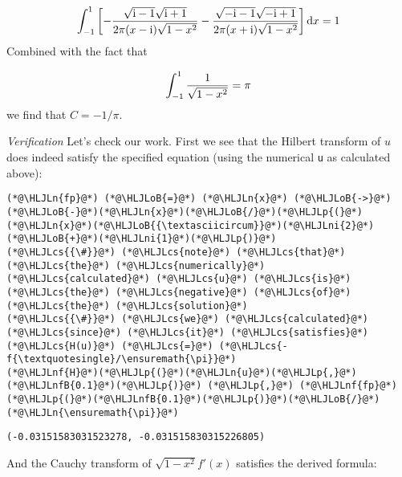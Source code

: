 \documentclass[12pt,landscape]{article}
\newcommand{\HLJLn}[1]{#1}
\newcommand{\HLJLnf}[1]{\textcolor[RGB]{66,102,213}{#1}}
\newcommand{\HLJLnfB}[1]{\textcolor[RGB]{59,151,46}{#1}}
\newcommand{\HLJLni}[1]{\textcolor[RGB]{59,151,46}{#1}}
\newcommand{\HLJLoB}[1]{\textcolor[RGB]{102,102,102}{\textbf{#1}}}
\newcommand{\HLJLp}[1]{#1}
\newcommand{\HLJLcs}[1]{\textcolor[RGB]{153,153,119}{\textit{#1}}}
\def\D{ {\rm d} }
\def\I{ {\rm i} }
\def\dx{\D x}
\begin{document}
{\[
\int_{-1}^1\left[- {\sqrt{\I - 1} \sqrt{\I+1} \over 2 \pi (x-\I)\sqrt{1-x^2}} -  {\sqrt{-\I - 1} \sqrt{-\I+1} \over 2 \pi (x+\I) \sqrt{1-x^2}} \right]\dx = 1
\]
Combined with the fact that

\[
\int_{-1}^1 {1 \over \sqrt{1-x^2}} = \pi
\]
we find that $C = -1/\pi$.

\emph{Verification} Let's check our work. First we see that the Hilbert transform of $u$ does indeed satisfy the specified equation (using the numerical \texttt{u} as calculated above):


\begin{lstlisting}
(*@\HLJLn{fp}@*) (*@\HLJLoB{=}@*) (*@\HLJLn{x}@*) (*@\HLJLoB{->}@*) (*@\HLJLoB{-}@*)(*@\HLJLn{x}@*)(*@\HLJLoB{/}@*)(*@\HLJLp{(}@*)(*@\HLJLn{x}@*)(*@\HLJLoB{{\textasciicircum}}@*)(*@\HLJLni{2}@*)(*@\HLJLoB{+}@*)(*@\HLJLni{1}@*)(*@\HLJLp{)}@*)
(*@\HLJLcs{{\#}}@*) (*@\HLJLcs{note}@*) (*@\HLJLcs{that}@*) (*@\HLJLcs{the}@*) (*@\HLJLcs{numerically}@*) (*@\HLJLcs{calculated}@*) (*@\HLJLcs{u}@*) (*@\HLJLcs{is}@*) (*@\HLJLcs{the}@*) (*@\HLJLcs{negative}@*) (*@\HLJLcs{of}@*) (*@\HLJLcs{the}@*) (*@\HLJLcs{solution}@*)
(*@\HLJLcs{{\#}}@*) (*@\HLJLcs{we}@*) (*@\HLJLcs{calculated}@*) (*@\HLJLcs{since}@*) (*@\HLJLcs{it}@*) (*@\HLJLcs{satisfies}@*) (*@\HLJLcs{H(u)}@*) (*@\HLJLcs{=}@*) (*@\HLJLcs{-f{\textquotesingle}/\ensuremath{\pi}}@*)
(*@\HLJLnf{H}@*)(*@\HLJLp{(}@*)(*@\HLJLn{u}@*)(*@\HLJLp{,}@*) (*@\HLJLnfB{0.1}@*)(*@\HLJLp{)}@*) (*@\HLJLp{,}@*) (*@\HLJLnf{fp}@*)(*@\HLJLp{(}@*)(*@\HLJLnfB{0.1}@*)(*@\HLJLp{)}@*)(*@\HLJLoB{/}@*)(*@\HLJLn{\ensuremath{\pi}}@*)
\end{lstlisting}

\begin{lstlisting}
(-0.03151583031523278, -0.031515830315226805)
\end{lstlisting}


And the Cauchy transform of $\sqrt{1-x^2} f'(x)$ satisfies the derived formula:


}
\end{document}
